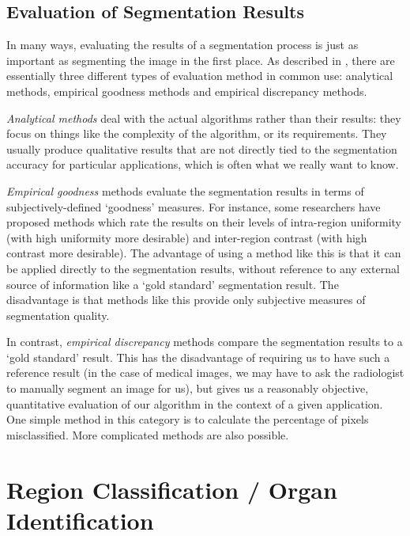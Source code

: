 \subsection{Evaluation of Segmentation Results}


In many ways, evaluating the results of a segmentation process is just as important as segmenting the image in the first place. As described in \cite{zhang96}, there are essentially three different types of evaluation method in common use: analytical methods, empirical goodness methods and empirical discrepancy methods.

\emph{Analytical methods} deal with the actual algorithms rather than their results: they focus on things like the complexity of the algorithm, or its requirements. They usually produce qualitative results that are not directly tied to the segmentation accuracy for particular applications, which is often what we really want to know.

\emph{Empirical goodness} methods evaluate the segmentation results in terms of subjectively-defined `goodness' measures. For instance, some researchers have proposed methods which rate the results on their levels of intra-region uniformity (with high uniformity more desirable) and inter-region contrast (with high contrast more desirable). The advantage of using a method like this is that it can be applied directly to the segmentation results, without reference to any external source of information like a `gold standard' segmentation result. The disadvantage is that methods like this provide only subjective measures of segmentation quality.

In contrast, \emph{empirical discrepancy} methods compare the segmentation results to a `gold standard' result. This has the disadvantage of requiring us to have such a reference result (in the case of medical images, we may have to ask the radiologist to manually segment an image for us), but gives us a reasonably objective, quantitative evaluation of our algorithm in the context of a given application. One simple method in this category is to calculate the percentage of pixels misclassified. More complicated methods are also possible.

\section{Region Classification / Organ Identification}

\iffalse

